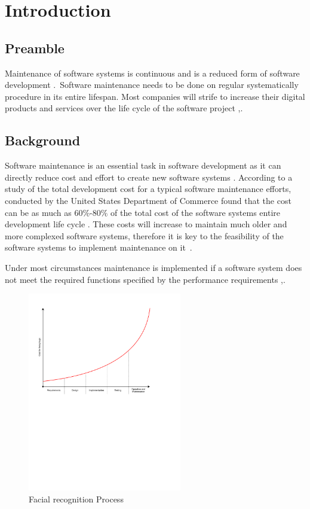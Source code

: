 \chapter{Introduction}
\label{chap:1}

\section{Preamble}
Maintenance of software systems is continuous and is a reduced form of software
development \cite{Sneed2004}.~Software maintenance needs to be done on regular
systematically procedure in its entire lifespan. Most companies will strife to increase their digital products and services over the life cycle of the software project \cite{Niu2018},\cite{Galster2019}.

\section{Background}
Software maintenance is an essential task in software development as it can directly reduce cost and effort to create new software systems \cite{FrancisThamburaj2017}. According to a study of the total development cost for a typical software maintenance efforts, conducted by the United States Department of Commerce found that the cost can be as much as $60\%$-$80\%$ of the total cost of the software systems entire development life cycle \cite{Ogheneovo2014}. These costs will increase to maintain much older and more complexed software systems, therefore it is key to the feasibility of the software systems to implement maintenance on it~\cite{Alenezi2016}.\par Under most circumstances maintenance is implemented if a software system does not meet the required functions specified by the performance requirements \cite{Ogheneovo2014},\cite{Sneed2004}.

\begin{figure}[!htb] %
    \centering %
    \includegraphics[width=0.6\textwidth]{Images/Chapter1/Background/Cost_of_fixing_bugs/Cost_of_fixing_bugs.pdf}
    \caption{Facial recognition Process}\label{fig:facial recognition process}
\end{figure} 


